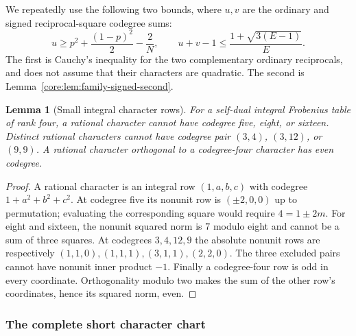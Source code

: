 \documentclass[11pt,a4paper]{article}
\newtheorem{lemma}[theorem]{Lemma}
\theoremstyle{definition}\newtheorem{definition}[theorem]{Definition}
\theoremstyle{remark}\newtheorem{remark}[theorem]{Remark}
\numberwithin{equation}{section}
\begin{document}
We repeatedly use the following two bounds, where $u,v$ are the ordinary
and signed reciprocal-square codegree sums:
\begin{equation}\label{qs:moments}
 u\ge p^2+\frac{(1-p)^2}{2}-\frac2N,
 \qquad u+v-1\le\frac{1+\sqrt{3(E-1)}}E.
\end{equation}
The first is Cauchy's inequality for the two complementary ordinary
reciprocals, and does not assume that their characters are quadratic.
The second is Lemma~\ref{core:lem:family-signed-second}.

\begin{lemma}[Small integral character rows]\label{quad:lem:small-rows}
For a self-dual integral Frobenius table of rank four, a rational
character cannot have codegree five, eight, or sixteen. Distinct
rational characters cannot have codegree pair $(3,4)$, $(3,12)$,
or $(9,9)$. A rational character orthogonal to a codegree-four character
has even codegree.
\end{lemma}
\begin{proof}
A rational character is an integral row $(1,a,b,c)$ with codegree
$1+a^2+b^2+c^2$. At codegree five its nonunit row is $(\pm2,0,0)$
up to permutation; evaluating the corresponding square would require
$4=1\pm2m$. For eight and sixteen, the nonunit squared norm is
$7$ modulo eight and cannot be a sum of three squares.
At codegrees $3,4,12,9$ the absolute nonunit rows are respectively
$(1,1,0),(1,1,1),(3,1,1),(2,2,0)$. The three excluded pairs cannot
have nonunit inner product $-1$. Finally a codegree-four row is odd
in every coordinate. Orthogonality modulo two makes the sum of the
other row's coordinates, hence its squared norm, even.
\end{proof}

\subsubsection{The complete short character chart}
\end{document}
